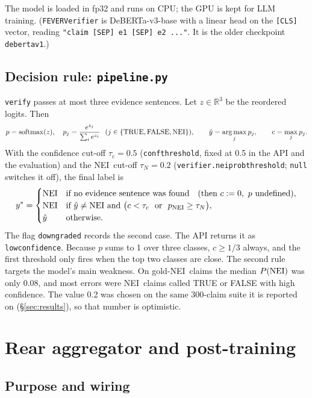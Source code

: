 \documentclass[11pt,a4paper]{article}
\makeatletter
\DeclareRobustCommand{\_}{\ifmmode\nfss@text{\textunderscore}\else\textunderscore\allowbreak\fi}
\newcommand{\file}[1]{\texttt{#1}}
\newcommand{\NEI}{\textup{NEI}}
\DeclareMathOperator*{\argmax}{arg\,max}
\makeatother
\begin{document}
The model is loaded in fp32 and runs on CPU; the GPU is kept for LLM training.
(\texttt{FEVERVerifier} is DeBERTa-v3-base with a linear head on the \texttt{[CLS]} vector, reading
\texttt{"claim [SEP] e1 [SEP] e2 ..."}. It is the older checkpoint \texttt{deberta\_v1}.)

\subsection{Decision rule: \file{pipeline.py}}

\texttt{verify} passes at most three evidence sentences. Let $z\in\mathbb{R}^3$ be the reordered logits. Then
\[
  p = \operatorname{softmax}(z),\quad p_j = \frac{e^{z_j}}{\sum_{i} e^{z_i}}\ \ (j\in\{\text{TRUE},\text{FALSE},\NEI\}),
  \qquad \hat y = \argmax_j p_j,\qquad c = \max_j p_j .
\]
With the confidence cut-off $\tau_c = 0.5$ (\texttt{conf\_threshold}, fixed at 0.5 in the API and the evaluation) and
the \NEI\ cut-off $\tau_N = 0.2$ (\texttt{verifier.nei\_prob\_threshold}; \texttt{null} switches it off), the final
label is
\[
  y^{\ast} =
  \begin{cases}
    \NEI & \text{if no evidence sentence was found}\quad(\text{then } c := 0,\ p\text{ undefined}),\\
    \NEI & \text{if } \hat y \neq \NEI \ \text{and}\ \big(c < \tau_c \ \text{ or }\ p_{\NEI} \ge \tau_N\big),\\
    \hat y & \text{otherwise.}
  \end{cases}
\]
The flag \texttt{downgraded} records the second case. The API returns it as \texttt{low\_confidence}. Because
$p$ sums to 1 over three classes, $c\ge 1/3$ always, and the first threshold only fires when the top two classes
are close. The second rule targets the model's main weakness. On gold-\NEI\ claims the median $P(\NEI)$ was only 0.08,
and most errors were \NEI\ claims called TRUE or FALSE with high confidence. The value 0.2 was chosen on the same
300-claim suite it is reported on (\S\ref{sec:results}), so that number is optimistic.

\section{Rear aggregator and post-training}

\subsection{Purpose and wiring}
\end{document}
